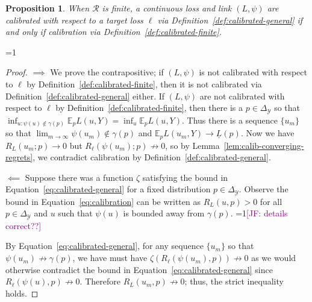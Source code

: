 \documentclass{article}
\newcommand{\Comments}{1}
\newcommand{\mynote}[2]{\ifnum\Comments=1\textcolor{#1}{#2}\fi}
\newcommand{\mytodo}[2]{\ifnum\Comments=1%
	\todo[linecolor=#1!80!black,backgroundcolor=#1,bordercolor=#1!80!black]{#2}\fi}
\newcommand{\jessie}[1]{\mynote{purple}{[JF: #1]}}
\newcommand{\jessiet}[1]{\mytodo{purple!20!white}{JF: #1}}
\newcommand{\simplex}{\Delta_\Y}
\newcommand{\E}{\mathbb{E}}
\newcommand{\R}{\mathcal{R}}
\newcommand{\Y}{\mathcal{Y}}
\newcommand{\exploss}[3]{\E_{#3} #1(#2,Y)}
\newcommand{\risk}[1]{\underline{#1}}
\newtheorem{proposition}{Proposition}
\begin{document}
\begin{proposition}
	When $\R$ is finite, a continuous loss and link $(L, \psi)$ are calibrated with respect to a target loss $\ell$ via Definition~\ref{def:calibrated-general} if and only if calibration via Definition~\ref{def:calibrated-finite}.
\end{proposition}\jessiet{Okay if $\Gamma$ is empty}
\begin{proof}
$\implies$
	We prove the contrapositive; if $(L, \psi)$ is not calibrated with respect to $\ell$ by Definition~\ref{def:calibrated-finite}, then it is not calibrated via Definition~\ref{def:calibrated-general} either.
	If $(L, \psi)$ are not calibrated with respect to $\ell$ by Definition~\ref{def:calibrated-finite}, then there is a $p \in \simplex$ so that $\inf_{u : \psi(u) \not \in \gamma(p)} \exploss{L}{u}{p} = \inf_u \exploss{L}{u}{p}$.
	Thus there is a sequence $\{u_m\}$ so that $\lim_{m \to \infty} \psi(u_m) \not \in \gamma(p)$ and $\exploss{L}{u_m}{p} \to \risk{L}(p)$.  
	Now we have $R_L(u_m; p) \to 0$ but $R_\ell(\psi(u_m); p) \not \to 0$, so by Lemma~\ref{lem:calib-converging-regrets}, we contradict calibration by Definition~\ref{def:calibrated-general}.
%	
%	
%	

$\impliedby$
Suppose there was a function $\zeta$ satisfying the bound in Equation~\eqref{eq:calibrated-general} for a fixed distribution $p \in \simplex$.
Observe the bound in Equation~\eqref{eq:calibration} can be written as $R_L(u,p) > 0$ for all $p \in \simplex$ and $u$ such that $\psi(u)$ is bounded away from $\gamma(p)$. \jessie{details correct??}

By Equation~\eqref{eq:calibrated-general}, for any sequence $\{u_m\}$ so that $\psi(u_m) \not \to \gamma(p)$, we have must have $\zeta(R_\ell(\psi(u_m), p)) \not \to 0$ as we would otherwise contradict the bound in Equation~\eqref{eq:calibrated-general} since $R_\ell(\psi(u), p) \not \to 0$. 
Therefore $R_L(u_m, p) \not \to 0$; thus, the strict inequality holds.
\end{proof}
\end{document}
